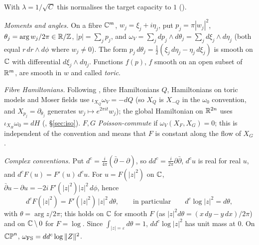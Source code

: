 With $\lambda=1/\sqrt C$ this normalises the target capacity to $1$ ().

\emph{Moments and angles.} On a fibre $\mathbb{C}^m$, $w_j=\xi_j+i\eta_j$, put $p_j=\pi|w_j|^2$, $\theta_j=\arg w_j/2\pi\in\mathbb{R}/\mathbb{Z}$, $|p|=\sum_jp_j$, and $\omega_V=\sum_jdp_j\wedge d\theta_j=\sum_jd\xi_j\wedge d\eta_j$ (both equal $r\,dr\wedge d\phi$ where $w_j\ne0$). The form $p_j\,d\theta_j=\frac12(\xi_j\,d\eta_j-\eta_j\,d\xi_j)$ is smooth on $\mathbb{C}$ with differential $d\xi_j\wedge d\eta_j$. Functions $f(p)$, $f$ smooth on an open subset of $\mathbb{R}^m$, are smooth in $w$ and called \emph{toric}.

\emph{Fibre Hamiltonians.} Following \cite{OpenAI2026}, fibre Hamiltonians $Q$, Hamiltonians on toric models and Moser fields use $\iota_{X_Q}\omega_V=-dQ$ (so $X_Q$ is $X_{-Q}$ in the $\omega_0$ convention, and $X_{p_j}=\partial_{\theta_j}$ generates $w_j\mapsto e^{2\pi it}w_j$); the global Hamiltonian on $\mathbb{R}^{2n}$ uses $\iota_{X_H}\omega_0=dH$ (, \S\ref{sec:iso}). $F,G$ \emph{Poisson-commute} if $\omega_V(X_F,X_G)=0$; this is independent of the convention and means that $F$ is constant along the flow of $X_G$.

\emph{Complex conventions.} Put $d^c=\frac{i}{4\pi}(\bar\partial-\partial)$, so $dd^c=\frac{i}{2\pi}\partial\bar\partial$, $d^cu$ is real for real $u$, and $d^cF(u)=F'(u)\,d^cu$. For $u=F(|z|^2)$ on $\mathbb{C}$, $\bar\partial u-\partial u=-2i\,F'(|z|^2)|z|^2\,d\phi$, hence
\begin{equation}\label{eq:pre-dc}
 d^cF(|z|^2)=F'(|z|^2)\,|z|^2\,d\theta,\qquad\text{in particular}\qquad d^c\log|z|^2=d\theta,
\end{equation}
with $\theta=\arg z/2\pi$; this holds on $\mathbb{C}$ for smooth $F$ (as $|z|^2d\theta=(x\,dy-y\,dx)/2\pi$) and on $\mathbb{C}\setminus0$ for $F=\log$. Since $\int_{|z|=\varepsilon}d\theta=1$, $dd^c\log|z|^2$ has unit mass at $0$. On $\mathbb{CP}^n$, $\omega_{\rm FS}=dd^c\log\|Z\|^2$.


